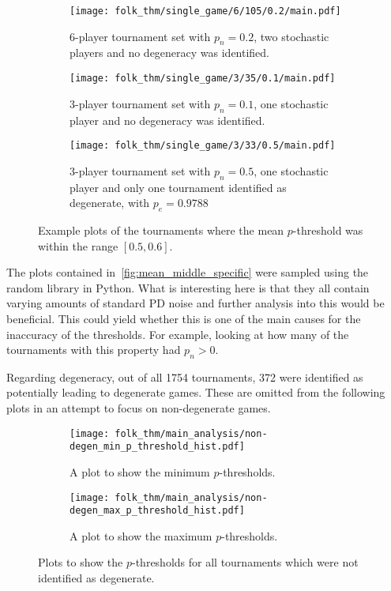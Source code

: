 \begin{figure}
    \begin{subfigure}{0.3\textwidth}
        \centering
        \texttt{[image: folk\_thm/single\_game/6/105/0.2/main.pdf]}
        \caption{6-player tournament set with \(p_{n}=0.2\), two stochastic players and no degeneracy was identified.}
    \end{subfigure}
    \begin{subfigure}{0.3\textwidth}
        \centering
        \texttt{[image: folk\_thm/single\_game/3/35/0.1/main.pdf]}
        \caption{3-player tournament set with \(p_{n}=0.1\), one stochastic player and no degeneracy was identified.}
    \end{subfigure}
    \begin{subfigure}{0.3\textwidth}
        \centering
        \texttt{[image: folk\_thm/single\_game/3/33/0.5/main.pdf]}
        \caption{3-player tournament set with \(p_{n}=0.5\), one stochastic player and only one tournament identified as degenerate, with \(p_{e}=0.9788\)}
    \end{subfigure}
    \caption{Example plots of the tournaments where the mean \(p\)-threshold was within the range \([0.5, 0.6]\).}\label{fig:mean_middle_specific}
\end{figure}

The plots contained in~\autoref{fig:mean_middle_specific} were sampled using the random library in Python. What is interesting here is that
they all contain varying amounts of standard PD noise and further analysis into
this would be beneficial. This could yield whether this is one of the main causes for the
inaccuracy of the thresholds. For example, looking at how many of the
tournaments with this property had \(p_{n} > 0\).

Regarding degeneracy, out of all 1754 tournaments, 372 were identified as
potentially leading to degenerate games.
These are omitted from the following plots in an attempt to focus on
non-degenerate games.

\begin{figure}
    \begin{subfigure}{0.45\textwidth}
        \centering
        \texttt{[image: folk\_thm/main\_analysis/non-degen\_min\_p\_threshold\_hist.pdf]}
        \caption{A plot to show the minimum \(p\)-thresholds.}\label{subfig:non_degen_min_p_thresh}
    \end{subfigure}
    \begin{subfigure}{0.45\textwidth}
        \centering
        \texttt{[image: folk\_thm/main\_analysis/non-degen\_max\_p\_threshold\_hist.pdf]}
        \caption{A plot to show the maximum \(p\)-thresholds.}\label{subfig:non_degen_max_p_thresh}
    \end{subfigure}
    \caption{Plots to show the \(p\)-thresholds for all tournaments which were not identified as degenerate.}\label{fig:non_degen_min_max_p_thresh}
\end{figure}


